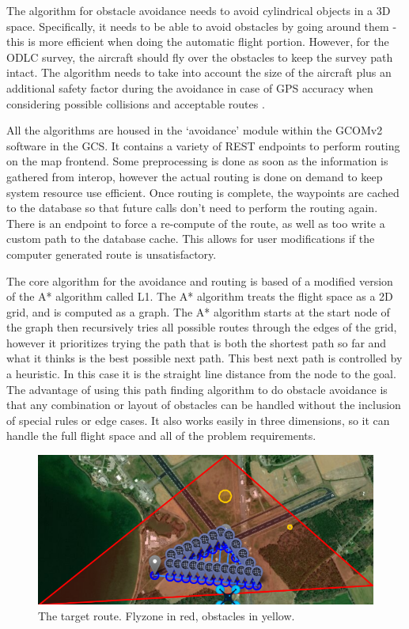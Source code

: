 The algorithm for obstacle avoidance needs to avoid cylindrical objects in a 3D space. Specifically, it needs to be able to avoid obstacles by going around them - this is more efficient when doing the automatic flight portion. However, for the ODLC survey, the aircraft should fly over the obstacles to keep the survey path intact. The algorithm needs to take into account the size of the aircraft plus an additional safety factor during the avoidance in case of GPS accuracy when considering possible collisions and acceptable routes .

All the algorithms are housed in the ‘avoidance’ module within the GCOMv2 software in the GCS. It contains a variety of REST endpoints to perform routing on the map frontend. Some preprocessing is done as soon as the information is gathered from interop, however the actual routing is done on demand to keep system resource use efficient. Once routing is complete, the waypoints are cached to the database so that future calls don’t need to perform the routing again. There is an endpoint to force a re-compute of the route, as well as too write a custom path to the database cache. This allows for user modifications if the computer generated route is unsatisfactory.

The core algorithm for the avoidance and routing is based of a modified version of the A* algorithm called L1. The A* algorithm treats the flight space as a 2D grid, and is computed as a graph. The A* algorithm starts at the start node of the graph then recursively tries all possible routes through the edges of the grid, however it prioritizes trying the path that is both the shortest path so far and what it thinks is the best possible next path. This best next path is controlled by a heuristic. In this case it is the straight line distance from the node to the goal. The advantage of using this path finding algorithm to do obstacle avoidance is that any combination or layout of obstacles can be handled without the inclusion of special rules or edge cases. It also works easily in three dimensions, so it can handle the full flight space and all of the problem requirements.

\begin{figure}[h]\centering
\includegraphics[width=\linewidth]{figures/OA_1.png}
\caption{The target route. Flyzone in red, obstacles in yellow.}
\label{fig:OA_1}
\end{figure}

